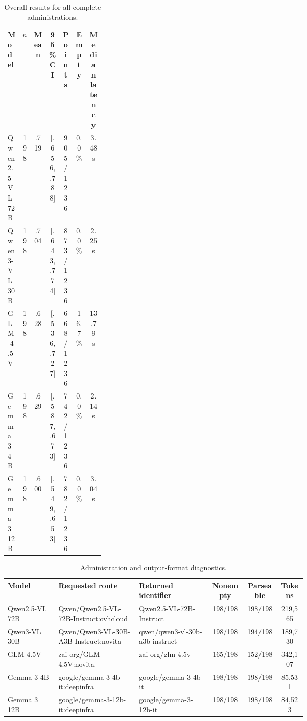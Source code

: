 \begin{table}[H]
\centering
\scriptsize
\caption{Overall results for all complete administrations.}
\label{tab:supp-overall}
\begin{tabular}{p{0.22\linewidth}cccccc}
\toprule
Model & $n$ & Mean & 95\% CI & Points & Empty & Median latency \\
\midrule
Qwen2.5-VL 72B & 198 & .719 & [.656, .788] & 905/1236 & 0.0\% & 3.48 s \\
Qwen3-VL 30B & 198 & .704 & [.643, .774] & 873/1236 & 0.0\% & 2.25 s \\
GLM-4.5V & 198 & .628 & [.536, .727] & 668/1236 & 16.7\% & 13.79 s \\
Gemma 3 4B & 198 & .629 & [.587, .673] & 742/1236 & 0.0\% & 2.14 s \\
Gemma 3 12B & 198 & .600 & [.549, .653] & 782/1236 & 0.0\% & 3.04 s \\
\bottomrule
\end{tabular}
\end{table}

\begin{table}[H]
\centering
\scriptsize
\caption{Administration and output-format diagnostics.}
\label{tab:supp-admin}
\begin{tabular}{p{0.17\linewidth}p{0.27\linewidth}p{0.24\linewidth}ccc}
\toprule
Model & Requested route & Returned identifier & Nonempty & Parseable & Tokens \\
\midrule
Qwen2.5-VL 72B & Qwen/Qwen2.5-VL-72B-Instruct:ovhcloud & Qwen2.5-VL-72B-Instruct & 198/198 & 198/198 & 219,565 \\
Qwen3-VL 30B & Qwen/Qwen3-VL-30B-A3B-Instruct:novita & qwen/qwen3-vl-30b-a3b-instruct & 198/198 & 194/198 & 189,730 \\
GLM-4.5V & zai-org/GLM-4.5V:novita & zai-org/glm-4.5v & 165/198 & 152/198 & 342,107 \\
Gemma 3 4B & google/gemma-3-4b-it:deepinfra & google/gemma-3-4b-it & 198/198 & 198/198 & 85,531 \\
Gemma 3 12B & google/gemma-3-12b-it:deepinfra & google/gemma-3-12b-it & 198/198 & 198/198 & 84,523 \\
\bottomrule
\end{tabular}
\end{table}

